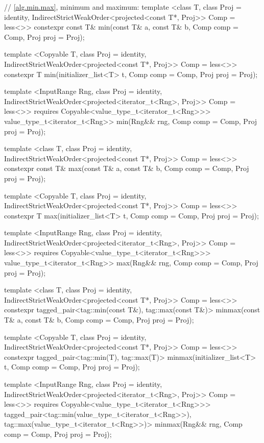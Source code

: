 \begin{codeblock}
{{{{  // \ref{alg.min.max}, minimum and maximum:
  template <class T, class Proj = identity,
      IndirectStrictWeakOrder<projected<const T*, Proj>> Comp = less<>>
    constexpr const T& min(const T& a, const T& b, Comp comp = Comp{}, Proj proj = Proj{});

  template <Copyable T, class Proj = identity,
      IndirectStrictWeakOrder<projected<const T*, Proj>> Comp = less<>>
    constexpr T min(initializer_list<T> t, Comp comp = Comp{}, Proj proj = Proj{});

  template <InputRange Rng, class Proj = identity,
      IndirectStrictWeakOrder<projected<iterator_t<Rng>, Proj>> Comp = less<>>
    requires Copyable<value_type_t<iterator_t<Rng>>>
    value_type_t<iterator_t<Rng>>
      min(Rng&& rng, Comp comp = Comp{}, Proj proj = Proj{});

  template <class T, class Proj = identity,
      IndirectStrictWeakOrder<projected<const T*, Proj>> Comp = less<>>
    constexpr const T& max(const T& a, const T& b, Comp comp = Comp{}, Proj proj = Proj{});

  template <Copyable T, class Proj = identity,
      IndirectStrictWeakOrder<projected<const T*, Proj>> Comp = less<>>
    constexpr T max(initializer_list<T> t, Comp comp = Comp{}, Proj proj = Proj{});

  template <InputRange Rng, class Proj = identity,
      IndirectStrictWeakOrder<projected<iterator_t<Rng>, Proj>> Comp = less<>>
    requires Copyable<value_type_t<iterator_t<Rng>>>
    value_type_t<iterator_t<Rng>>
      max(Rng&& rng, Comp comp = Comp{}, Proj proj = Proj{});

  template <class T, class Proj = identity,
      IndirectStrictWeakOrder<projected<const T*, Proj>> Comp = less<>>
    constexpr tagged_pair<tag::min(const T&), tag::max(const T&)>
      minmax(const T& a, const T& b, Comp comp = Comp{}, Proj proj = Proj{});

  template <Copyable T, class Proj = identity,
      IndirectStrictWeakOrder<projected<const T*, Proj>> Comp = less<>>
    constexpr tagged_pair<tag::min(T), tag::max(T)>
      minmax(initializer_list<T> t, Comp comp = Comp{}, Proj proj = Proj{});

  template <InputRange Rng, class Proj = identity,
      IndirectStrictWeakOrder<projected<iterator_t<Rng>, Proj>> Comp = less<>>
    requires Copyable<value_type_t<iterator_t<Rng>>>
    tagged_pair<tag::min(value_type_t<iterator_t<Rng>>),
                tag::max(value_type_t<iterator_t<Rng>>)>
      minmax(Rng&& rng, Comp comp = Comp{}, Proj proj = Proj{});

}}}}
\end{codeblock}
